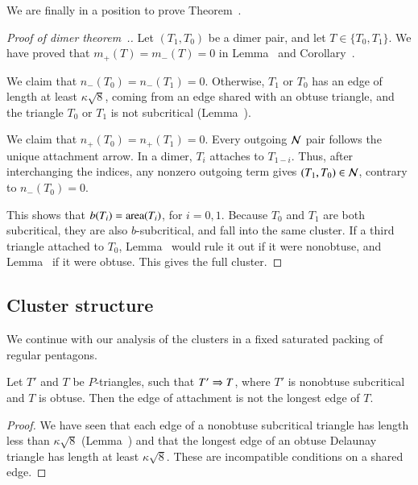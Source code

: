 We are finally in a position to prove Theorem~.

\begin{proof}[Proof of dimer theorem~.]
  Let $(T_1,T_0)$ be a dimer pair, and let $T\in \{T_0,T_1\}$.  We
  have proved that $m_+(T)=m_-(T)=0$ in Lemma~ and
  Corollary~.

  We claim that $n_-(T_0)=n_-(T_1)=0$.  Otherwise, $T_1$ or $T_0$ has
  an edge of length at least $\kappa\sqrt8$, coming from an edge
  shared with an obtuse triangle, and the triangle $T_0$ or $T_1$ is
  not subcritical (Lemma~).

  We claim that $n_+(T_0)=n_+(T_1)=0$.  Every outgoing $\mathcal N$
  pair follows the unique attachment arrow.  In a dimer, $T_i$
  attaches to $T_{1-i}$.  Thus, after interchanging the indices,
  any nonzero outgoing term gives $(T_1,T_0)\in\mathcal N$, contrary
  to $n_-(T_0)=0$.

  This shows that $b(T_i)={\operatorname{area}}(T_i)$, for $i=0,1$.  Because $T_0$ and
  $T_1$ are both subcritical, they are also $b$-subcritical, and fall
  into the same cluster. If a third triangle attached to $T_0$,
  Lemma~ would rule it out if it were nonobtuse,
  and Lemma~ if it were obtuse. This gives
  the full cluster.
\end{proof}

\subsection{Cluster structure}

We continue with our analysis of the clusters in a fixed saturated
packing of regular pentagons.  

\begin{lemma}  
  Let $T'$ and $T$ be $P$-triangles, such that $T'\Rightarrow T$, where
  $T'$ is nonobtuse subcritical and $T$ is obtuse.  Then the edge
  of attachment is not the longest edge of $T$.
\end{lemma}

\begin{proof} We have seen that each edge of a nonobtuse subcritical
  triangle has length less than $\kappa\sqrt8$ (Lemma~) and that the longest
  edge of an obtuse Delaunay triangle has length at least
  $\kappa\sqrt{8}$.  These are incompatible conditions on a shared
  edge.
\end{proof}

